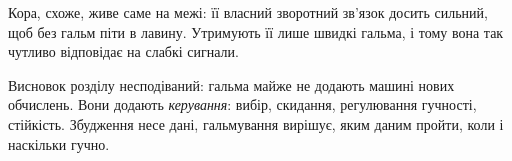 Кора, схоже, живе саме на межі: її власний зворотний зв'язок досить сильний, щоб без гальм піти в лавину. Утримують її лише швидкі гальма, і тому вона так чутливо відповідає на слабкі сигнали.

Висновок розділу несподіваний: гальма майже не додають машині нових обчислень. Вони додають \emph{керування}: вибір, скидання, регулювання гучності, стійкість. Збудження несе дані, гальмування вирішує, яким даним пройти, коли і наскільки гучно.


